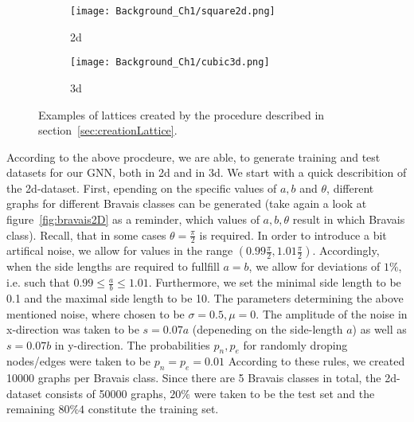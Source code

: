 \begin{figure}
    \centering
    \begin{subfigure}[t]{0.45\textwidth}
        \centering
        \texttt{[image: Background\_Ch1/square2d.png]}
        \caption{2d}
    \end{subfigure}
    \hfill
    \begin{subfigure}[t]{0.45\textwidth}
        \centering
        \texttt{[image: Background\_Ch1/cubic3d.png]}
        \caption{3d}
    \end{subfigure}
    \caption{Examples of lattices created by the procedure described in section~\ref{sec:creationLattice}.}
    \label{fig:examplesLattices}
\end{figure}

According to the above procdeure, we are able, to generate training and test datasets for our GNN, both in 2d and in 3d.
We start with a quick describition of the 2d-dataset. 
First, epending on the specific values of $a,b$ and $\theta$, different graphs for different Bravais classes can be generated 
(take again a look at figure~\ref{fig:bravais2D} as a reminder, which values of $a,b,\theta$ result in which Bravais class).
Recall, that in some cases $\theta=\frac{\pi}{2}$ is required. In order to introduce a bit artifical noise, we allow for values
in the range $(0.99\frac{\pi}{2}, 1.01\frac{\pi}{2})$.
Accordingly, when the side lengths are required to fullfill $a=b$, we allow for deviations of $1\%$, 
i.e. such that $0.99\leq\frac{a}{b}\leq1.01$.
Furthermore, we set the minimal side length to be 0.1 and the maximal side length to be 10. 
The parameters determining the above mentioned noise, where chosen to be $\sigma=0.5,\mu=0$. The amplitude of
the noise in x-direction was taken to be $s=0.07a$ (depeneding on the side-length $a$) as well as $s=0.07b$
in y-direction. The probabilities $p_n,p_e$ for randomly droping nodes/edges were taken to be $p_n=p_e=0.01$
According to these rules, we created 10000 graphs per Bravais class. Since there are 5 Bravais classes in total, the
2d-dataset consists of 50000 graphs, $20\%$ were taken to be the test set and the remaining $80\%4 $ constitute the training set.

